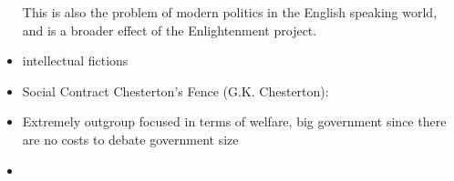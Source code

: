 \begin{itemize}
    This is also the problem of modern politics in the English speaking world, and is a broader effect of the Enlightenment project.
    \item intellectual fictions 
    \item Social Contract 
    Chesterton’s Fence (G.K. Chesterton):


    
    \item Extremely outgroup focused in terms of welfare, big government since there are no costs to debate government size

    \item 
\end{itemize}


